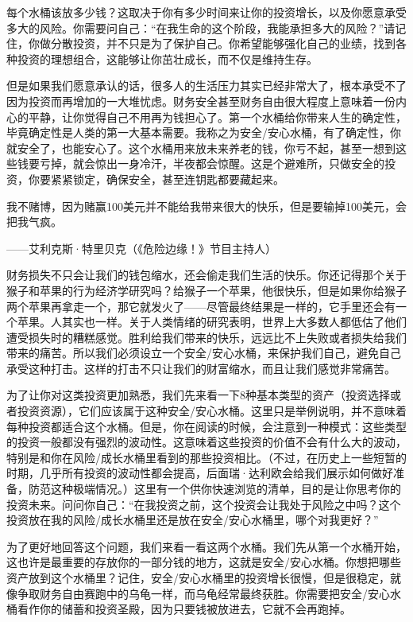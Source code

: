 每个水桶该放多少钱？这取决于你有多少时间来让你的投资增长，以及你愿意承受多大的风险。你需要问自己：“在我生命的这个阶段，我能承担多大的风险？”请记住，你做分散投资，并不只是为了保护自己。你希望能够强化自己的业绩，找到各种投资的理想组合，这能够让你茁壮成长，而不仅是维持生存。

但是如果我们愿意承认的话，很多人的生活压力其实已经非常大了，根本承受不了因为投资而再增加的一大堆忧虑。财务安全甚至财务自由很大程度上意味着一份内心的平静，让你觉得自己不用再为钱担心了。第一个水桶给你带来人生的确定性，毕竟确定性是人类的第一大基本需要。我称之为安全/安心水桶，有了确定性，你就安全了，也能安心了。这个水桶用来放未来养老的钱，你亏不起，甚至一想到这些钱要亏掉，就会惊出一身冷汗，半夜都会惊醒。这是个避难所，只做安全的投资，你要紧紧锁定，确保安全，甚至连钥匙都要藏起来。

\begin{BookQuote}
我不赌博，因为赌赢100美元并不能给我带来很大的快乐，但是要输掉100美元，会把我气疯。

\hfill ——艾利克斯·特里贝克（《危险边缘！》节目主持人）
\end{BookQuote}

财务损失不只会让我们的钱包缩水，还会偷走我们生活的快乐。你还记得那个关于猴子和苹果的行为经济学研究吗？给猴子一个苹果，他很快乐，但是如果你给猴子两个苹果再拿走一个，那它就发火了——尽管最终结果是一样的，它手里还会有一个苹果。人其实也一样。关于人类情绪的研究表明，世界上大多数人都低估了他们遭受损失时的糟糕感觉。胜利给我们带来的快乐，远远比不上失败或者损失给我们带来的痛苦。所以我们必须设立一个安全/安心水桶，来保护我们自己，避免自己承受这种打击。这样的打击不只让我们的财富缩水，而且让我们感觉非常痛苦。

为了让你对这类投资更加熟悉，我们先来看一下8种基本类型的资产（投资选择或者投资资源），它们应该属于这种安全/安心水桶。这里只是举例说明，并不意味着每种投资都适合这个水桶。但是，你在阅读的时候，会注意到一种模式：这些类型的投资一般都没有强烈的波动性。这意味着这些投资的价值不会有什么大的波动，特别是和你在风险/成长水桶里看到的那些投资相比。（不过，在历史上一些短暂的时期，几乎所有投资的波动性都会提高，后面瑞·达利欧会给我们展示如何做好准备，防范这种极端情况。）这里有一个供你快速浏览的清单，目的是让你思考你的投资未来。问问你自己：“在我投资之前，这个投资会让我处于风险之中吗？这个投资放在我的风险/成长水桶里还是放在安全/安心水桶里，哪个对我更好？”

为了更好地回答这个问题，我们来看一看这两个水桶。我们先从第一个水桶开始，这也许是最重要的存放你的一部分钱的地方，这就是安全/安心水桶。你想把哪些资产放到这个水桶里？记住，安全/安心水桶里的投资增长很慢，但是很稳定，就像争取财务自由赛跑中的乌龟一样，而乌龟经常最终获胜。你需要把安全/安心水桶看作你的储蓄和投资圣殿，因为只要钱被放进去，它就不会再跑掉。

